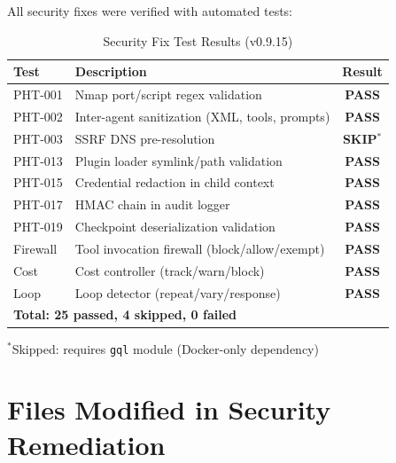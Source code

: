 \documentclass[12pt,a4paper]{article}
\begin{document}
All security fixes were verified with automated tests:

\begin{table}[H]
\centering
\caption{Security Fix Test Results (v0.9.15)}
\begin{tabularx}{\textwidth}{lXc}
\toprule
\textbf{Test} & \textbf{Description} & \textbf{Result} \\
\midrule
PHT-001 & Nmap port/script regex validation & \textcolor{codegreen}{\textbf{PASS}} \\
PHT-002 & Inter-agent sanitization (XML, tools, prompts) & \textcolor{codegreen}{\textbf{PASS}} \\
PHT-003 & SSRF DNS pre-resolution & \textcolor{phantomgray}{\textbf{SKIP}}$^*$ \\
PHT-013 & Plugin loader symlink/path validation & \textcolor{codegreen}{\textbf{PASS}} \\
PHT-015 & Credential redaction in child context & \textcolor{codegreen}{\textbf{PASS}} \\
PHT-017 & HMAC chain in audit logger & \textcolor{codegreen}{\textbf{PASS}} \\
PHT-019 & Checkpoint deserialization validation & \textcolor{codegreen}{\textbf{PASS}} \\
Firewall & Tool invocation firewall (block/allow/exempt) & \textcolor{codegreen}{\textbf{PASS}} \\
Cost & Cost controller (track/warn/block) & \textcolor{codegreen}{\textbf{PASS}} \\
Loop & Loop detector (repeat/vary/response) & \textcolor{codegreen}{\textbf{PASS}} \\
\midrule
\multicolumn{2}{l}{\textbf{Total: 25 passed, 4 skipped, 0 failed}} & \\
\bottomrule
\end{tabularx}
{\small $^*$Skipped: requires \texttt{gql} module (Docker-only dependency)}
\end{table}

\section{Files Modified in Security Remediation}
\end{document}
